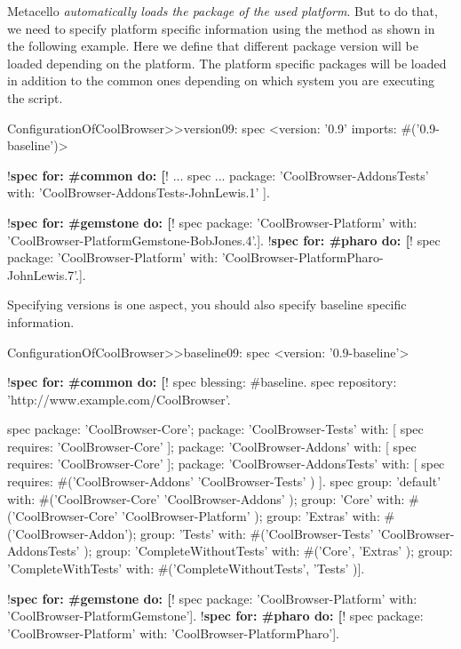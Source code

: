 \documentclass[a4paper,10pt,twoside]{book}
\begin{document}
Metacello \emph{automatically loads the package of the used platform}. But to do that, we need to specify platform specific information using the method  as shown in the following example. Here we define that different package version will be loaded depending on the platform. The platform specific packages will be loaded in addition to the common ones depending on which system you are executing the script.

\begin{code}{}
ConfigurationOfCoolBrowser>>version09: spec
       <version: '0.9' imports: #('0.9-baseline')>

       !\textbf{spec for: \#common do: [}!
              ...
              spec
                 ...
                     package: 'CoolBrowser-AddonsTests' with: 'CoolBrowser-AddonsTests-JohnLewis.1' ].

       !\textbf{spec for: \#gemstone do: [}!
              spec package: 'CoolBrowser-Platform' with: 'CoolBrowser-PlatformGemstone-BobJones.4'.].
       !\textbf{spec for: \#pharo do: [}!
              spec package: 'CoolBrowser-Platform' with: 'CoolBrowser-PlatformPharo-JohnLewis.7'.].
\end{code}

Specifying versions is one aspect, you should also specify baseline specific information.

\begin{code}{}
ConfigurationOfCoolBrowser>>baseline09: spec
      <version: '0.9-baseline'>

      !\textbf{spec for: \#common do: [}!
            spec blessing: #baseline.
            spec repository: 'http://www.example.com/CoolBrowser'.

            spec
                  package: 'CoolBrowser-Core';
                  package: 'CoolBrowser-Tests' with: [ spec requires: 'CoolBrowser-Core' ];
                  package: 'CoolBrowser-Addons' with: [ spec requires: 'CoolBrowser-Core' ];
                  package: 'CoolBrowser-AddonsTests' with: [
                        spec requires: #('CoolBrowser-Addons' 'CoolBrowser-Tests' ) ].
            spec
                  group: 'default' with: #('CoolBrowser-Core' 'CoolBrowser-Addons' );
                  group: 'Core' with: #('CoolBrowser-Core' 'CoolBrowser-Platform' );
                  group: 'Extras' with: #('CoolBrowser-Addon');
                  group: 'Tests' with: #('CoolBrowser-Tests' 'CoolBrowser-AddonsTests' );
                  group: 'CompleteWithoutTests' with: #('Core', 'Extras' );
                  group: 'CompleteWithTests' with: #('CompleteWithoutTests', 'Tests' )].

      !\textbf{spec for: \#gemstone do: [}!
            spec package: 'CoolBrowser-Platform' with: 'CoolBrowser-PlatformGemstone'].
      !\textbf{spec for: \#pharo do: [}!
            spec package: 'CoolBrowser-Platform' with: 'CoolBrowser-PlatformPharo'].
\end{code}
\end{document}
